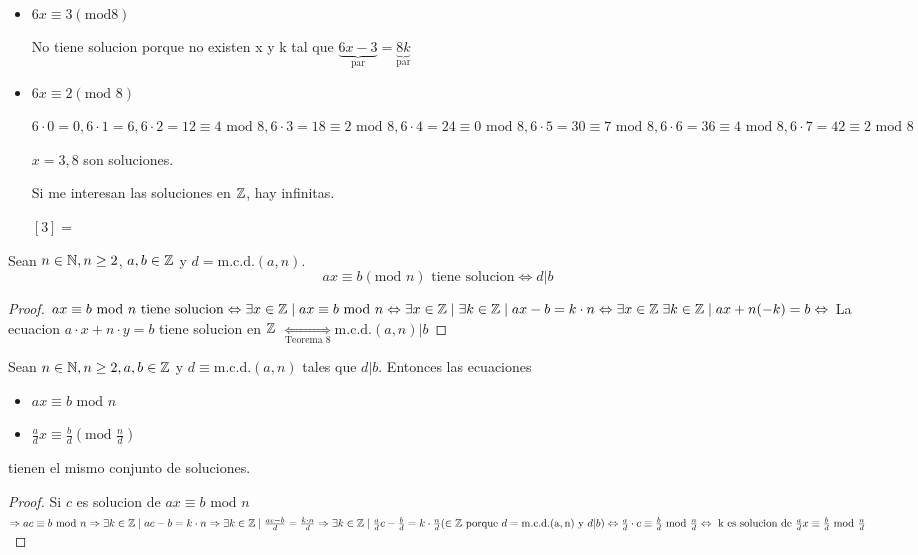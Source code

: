 \begin{example}
	~\begin{itemize}
		\item \(6x \equiv 3 (\mathrm{mod } 8)\)
		      
		      No tiene solucion porque no existen x y k tal que \(\underbrace{6x - 3}_{\text{par}} = \underbrace{8k}_{\text{par} } \)
		      
		\item \(6x \equiv 2 (\text{mod } 8)\)
		      
		      \(6 \cdot 0 = 0, 6 \cdot 1 = 6, 6 \cdot 2 = 12 \equiv 4 \text{ mod } 8, \boxed{6 \cdot 3 = 18 \equiv 2 \text{ mod } 8}, 6 \cdot 4 = 24 \equiv 0 \text{ mod } 8, 6 \cdot 5 = 30 \equiv 7 \text{ mod } 8, 6 \cdot 6 = 36 \equiv 4 \text{ mod } 8, \boxed{6 \cdot 7 = 42 \equiv 2 \text{ mod } 8}    \)
		      
		      \(x = 3,8 \) son soluciones.
		      
		      Si me interesan las soluciones en \(\mathbb{Z} \), hay infinitas.
		      
		      \([3] = \)
	\end{itemize}
\end{example}

\begin{proposition}
	Sean \(n \in \mathbb{N}, n \geq 2\), \(a,b \in \mathbb{Z} \) y \(d = \mathrm{m.c.d.}(a,n) \).
	\[
		ax \equiv b (\text{mod } n) \text{ tiene solucion} \iff d|b
	\]
\end{proposition}
\begin{proof}
	\(ax \equiv b \text{ mod }  n \text{ tiene solucion} \Leftrightarrow \exists x \in \mathbb{Z} \mid ax \equiv b \text{ mod } n \Leftrightarrow \exists x \in \mathbb{Z} \mid \exists k \in \mathbb{Z} \mid ax - b = k \cdot n \Leftrightarrow \exists x \in \mathbb{Z} \; \exists k \in \mathbb{Z} \mid ax + n (-k) = b \Leftrightarrow   \) La ecuacion \(a \cdot x + n \cdot y = b \) tiene solucion en \(\mathbb{Z} \) \(\underset{\text{Teorema 8}}{\iff} \mathrm{m.c.d.}(a,n) | b  \)
\end{proof}

\begin{proposition}
	Sean \(n \in \mathbb{N}, n \geq 2, a,b \in \mathbb{Z} \) y \(d \equiv \mathrm{m.c.d.}(a,n)	 \) tales que \(d|b \). Entonces las ecuaciones
	\begin{itemize}
		\item \(ax \equiv b \text{ mod }n 	 \)
		\item \(\frac{a}{d} x \equiv \frac{b}{d} (\text{mod } \frac{n}{d })\)
	\end{itemize}
	tienen el mismo conjunto de soluciones.
\end{proposition}
\begin{proof}
	Si \(c \) es solucion de \(ax \equiv b \text{ mod } n \) \(\Rightarrow ac \equiv b \text{ mod } n \Rightarrow \exists k \in \mathbb{Z} \mid ac - b = k \cdot n \Rightarrow \exists k \in \mathbb{Z} \mid \frac{ac-b}{d} = \frac{k\cdot  n}{d } \Rightarrow \exists k \in \mathbb{Z} \mid \frac{a}{d} c - \frac{b}{d} = k \cdot \frac{n}{d } (\in \mathbb{Z}\text{ porque } d = \mathrm{m.c.d.(a,n)} \text{ y } d|b)   \Leftrightarrow \frac{a}{d} \cdot c \equiv \frac{b}{d} \text{ mod } \frac{n}{d} \Leftrightarrow  \text{ k es solucion de } \frac{a}{d} x \equiv \frac{b}{d} \text{ mod } \frac{n}{d }\)
\end{proof}

